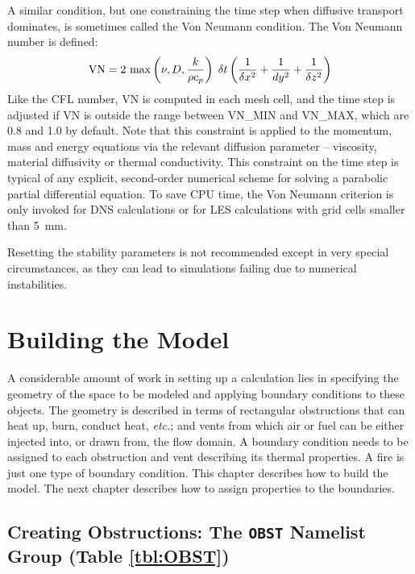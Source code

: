 \documentclass[11pt]{book}
\newcommand{\dx}{\delta x}
\newcommand{\dz}{\delta z}
\newcommand{\dt}{\delta t}
\newcommand{\be}{\begin{equation}}
\newcommand{\ee}{\end{equation}}
\begin{document}
A similar condition, but one constraining the time step when diffusive transport dominates, is sometimes called
the Von Neumann condition. The Von Neumann number is defined:
\be
\hbox{VN} = 2 \, \max \left( \nu , D , \frac{k}{\rho c_p} \right)  \; \dt  \left(\frac{1}{\dx^2}+\frac{1}{dy^2}+\frac{1}{\dz^2} \right)
\ee
Like the CFL number, VN is computed in each mesh cell, and the time step is adjusted if VN is outside the
range between {\ct VN\_MIN} and {\ct VN\_MAX}, which are 0.8 and 1.0 by default.
Note that this constraint is applied to the momentum, mass and energy equations via the
relevant diffusion parameter -- viscosity, material diffusivity or thermal conductivity.
This constraint on the time step is typical
of any explicit, second-order numerical scheme for solving a parabolic partial differential
equation. To save CPU time, the Von Neumann criterion is only invoked for DNS calculations or for LES
calculations with grid cells smaller than 5~mm.

\begin{warning}
Resetting the stability parameters is not recommended except in very special circumstances, as they can lead to
simulations failing due to numerical instabilities.
\end{warning}








\chapter{Building the Model}

A considerable amount of work in setting up a calculation lies in specifying the
geometry of the space to be modeled and applying boundary conditions
to these objects. The geometry is described in terms
of rectangular obstructions that can heat up, burn, conduct heat, {\em etc.};
and vents from which air or fuel can be
either injected into, or drawn from, the flow domain.
A boundary condition needs to be assigned to each obstruction
and vent describing its thermal properties. A fire is just one type of
boundary condition. This chapter describes how to build the model. The next
chapter describes how to assign properties to the boundaries.



\section{Creating Obstructions: The \texorpdfstring{{\tt OBST}}{OBST} Namelist Group (Table \ref{tbl:OBST})}
\label{info:OBST}
\end{document}
